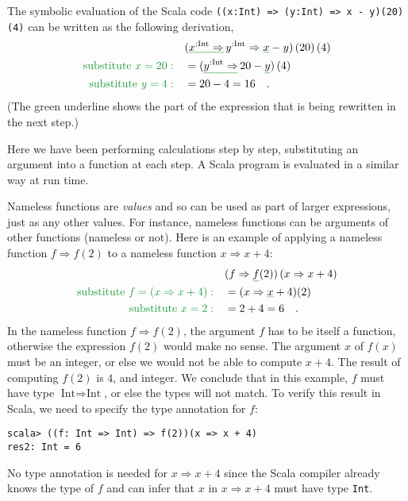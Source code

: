 The symbolic evaluation of the Scala code \lstinline!((x:Int) => (y:Int) => x - y)(20)(4)!
can be written as the following derivation,
\begin{align*}
 & (\gunderline{x^{:\text{Int}}\Rightarrow}\,y^{:\text{Int}}\Rightarrow\gunderline x-y)\left(20\right)\left(4\right)\\
{\color{greenunder}\text{substitute }x=20:}\quad & =(\gunderline{y^{:\text{Int}}\Rightarrow}\,20-\gunderline y)\left(4\right)\\
{\color{greenunder}\text{substitute }y=4:}\quad & =20-4=16\quad.
\end{align*}
(The green underline shows the part of the expression that is being
rewritten in the next step.)

Here we have been performing calculations step by step, substituting
an argument into a function at each step. A Scala program is evaluated
in a similar way at run time.

Nameless functions are \emph{values} and so can be used as part of
larger expressions, just as any other values. For instance, nameless
functions can be arguments of other functions (nameless or not). Here
is an example of applying a nameless function $f\Rightarrow f(2)$
to a nameless function $x\Rightarrow x+4$:
\begin{align*}
 & (f\Rightarrow\gunderline f(2))\left(x\Rightarrow x+4\right)\\
{\color{greenunder}\text{substitute }f=\left(x\Rightarrow x+4\right):}\quad & =(x\Rightarrow\gunderline x+4)(2)\\
{\color{greenunder}\text{substitute }x=2:}\quad & =2+4=6\quad.
\end{align*}
In the nameless function $f\Rightarrow f(2)$, the argument $f$ has
to be itself a function, otherwise the expression $f(2)$ would make
no sense. The argument $x$ of $f(x)$ must be an integer, or else
we would not be able to compute $x+4$. The result of computing $f(2)$
is $4$, and integer. We conclude that in this example, $f$ must
have type $\text{Int}\Rightarrow\text{Int}$, or else the types will
not match. To verify this result in Scala, we need to specify the
type annotation for $f$:
\begin{lstlisting}
scala> ((f: Int => Int) => f(2))(x => x + 4)
res2: Int = 6  
\end{lstlisting}
No type annotation is needed for $x\Rightarrow x+4$ since the Scala
compiler already knows the type of $f$ and can infer that $x$ in
$x\Rightarrow x+4$ must have type \lstinline!Int!.


